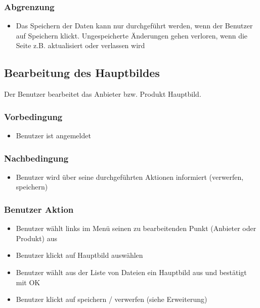 \documentclass[a4paper,12pt]{article}
\begin{document}
\subsubsection{Abgrenzung}\label{abgrenzung-3}

\begin{itemize}

\item
  Das Speichern der Daten kann nur durchgeführt werden, wenn der
  Benutzer auf Speichern klickt. Ungespeicherte Änderungen gehen
  verloren, wenn die Seite z.B. aktualisiert oder verlassen wird
\end{itemize}

\clearpage

\subsection{Bearbeitung des Hauptbildes}
Der Benutzer bearbeitet das Anbieter bzw. Produkt Hauptbild.

\subsubsection{Vorbedingung}\label{vorbedingung-4}

\begin{itemize}

\item
  Benutzer ist angemeldet
\end{itemize}

\subsubsection{Nachbedingung}\label{nachbedingung-4}

\begin{itemize}

\item
  Benutzer wird über seine durchgeführten Aktionen informiert
  (verwerfen, speichern)
\end{itemize}

\subsubsection{Benutzer Aktion}\label{benutzer-aktion-4}

\begin{itemize}

\item
  Benutzer wählt links im Menü seinen zu bearbeitenden Punkt (Anbieter
  oder Produkt) aus
\item
  Benutzer klickt auf Hauptbild auswählen
\item
  Benutzer wählt aus der Liste von Dateien ein Hauptbild aus und
  bestätigt mit OK
\item
  Benutzer klickt auf speichern / verwerfen (siehe Erweiterung)
\end{itemize}
\end{document}
